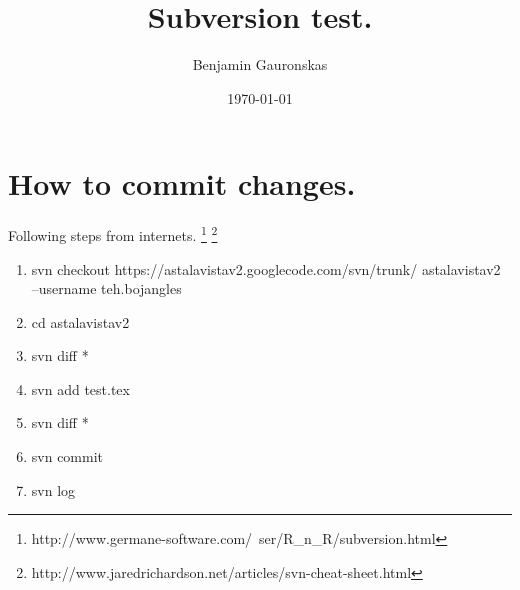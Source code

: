 \documentclass[12pt]{article}
\title{Subversion test.}
\author{Benjamin Gauronskas}
\date{\today}
\begin{document}
\maketitle
\doublespacing

\section{How to commit changes.}

Following steps from internets.
\footnote{http://www.germane-software.com/~ser/R\_n\_R/subversion.html}
\footnote{http://www.jaredrichardson.net/articles/svn-cheat-sheet.html}

\begin{enumerate}
\item svn checkout https://astalavistav2.googlecode.com/svn/trunk/ 
		astalavistav2 --username teh.bojangles
\item cd astalavistav2
\item svn diff *
\item svn add test.tex
\item svn diff *
\item svn commit
\item svn log

\end{enumerate}
\end{document}
